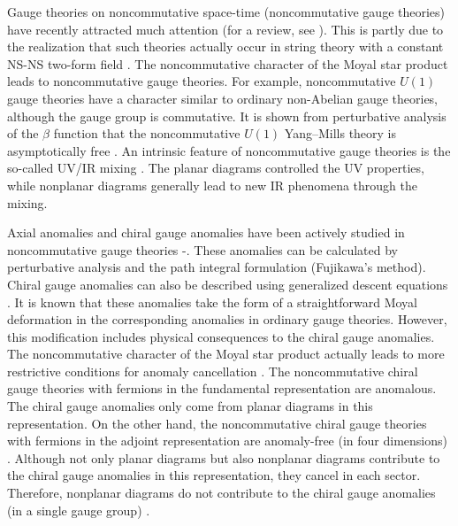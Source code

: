 \documentclass[a4paper,12pt]{article}
\begin{document}
Gauge theories on noncommutative space-time (noncommutative gauge theories) 
have recently attracted much attention (for a review, see \cite{MRDNAN}). 
This is partly due to the realization that such theories actually occur in 
string theory with a constant NS-NS two-form field \cite{NSEW}. 
The noncommutative character of the Moyal star product leads to 
noncommutative gauge theories. For example, noncommutative $U(1)$ gauge 
theories have a character similar to ordinary non-Abelian gauge theories, 
although the gauge group is commutative. It is shown from perturbative 
analysis of the $\beta$ function that the noncommutative $U(1)$ Yang--Mills 
theory is asymptotically free \cite{CPMDSR, SMMVR}. 
An intrinsic feature of noncommutative gauge theories is 
the so-called UV/IR mixing \cite{SMMVR}. The planar diagrams controlled the UV 
properties, while nonplanar diagrams generally lead to new IR phenomena 
through the mixing. 


Axial anomalies and chiral gauge anomalies have been actively studied in 
noncommutative gauge theories \cite{FANS0}-\cite{KIJK}. These 
anomalies can be calculated by perturbative analysis and the path integral 
formulation (Fujikawa's method). Chiral gauge anomalies can also be described 
using generalized descent equations \cite{LBMSAT}. It is known that these 
anomalies take the form of a straightforward Moyal deformation in the 
corresponding anomalies in ordinary gauge theories. However, this 
modification includes physical consequences 
to the chiral gauge anomalies. The noncommutative character of the Moyal star 
product actually leads to more restrictive conditions for anomaly 
cancellation \cite{JMGBCPM, LBMSAT}. The noncommutative chiral gauge 
theories with fermions in the fundamental representation 
are anomalous. The chiral gauge anomalies only come from planar diagrams in 
this representation. 
On the other hand, the noncommutative chiral gauge theories with fermions in 
the adjoint representation are anomaly-free (in four dimensions) 
\cite{CPM, FANS, JNMA}.  
Although not only planar diagrams but also nonplanar diagrams contribute to 
the chiral gauge anomalies in this representation, they cancel in each sector. 
Therefore, nonplanar diagrams do not contribute to the chiral gauge 
anomalies (in a single gauge group) \cite{CPM, KIJK}. 
\end{document}
